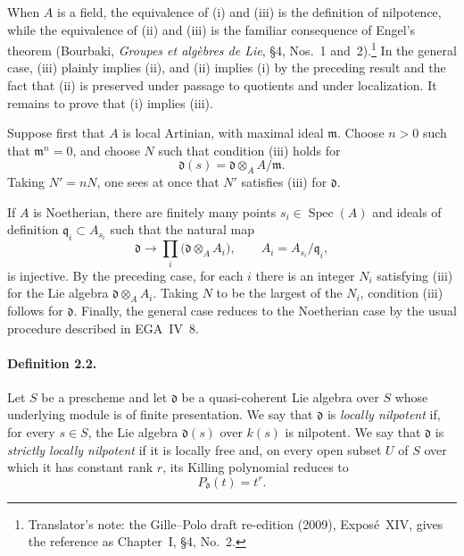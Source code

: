 
When \(A\) is a field, the equivalence of \textup{(i)} and
\textup{(iii)} is the definition of nilpotence, while the equivalence
of \textup{(ii)} and \textup{(iii)} is the familiar consequence of
Engel's theorem \textup{(Bourbaki, \emph{Groupes et algèbres de Lie},
\S4, Nos.~1 and~2)}.\footnote{Translator's note: the Gille--Polo draft re-edition (2009), Exposé~XIV, gives the reference as Chapter~I, \S4, No.~2.} In the general case,
\textup{(iii)} plainly implies \textup{(ii)}, and \textup{(ii)}
implies \textup{(i)} by the preceding result and the fact that
\textup{(ii)} is preserved under passage to quotients and under
localization. It remains to prove that \textup{(i)} implies
\textup{(iii)}.

Suppose first that \(A\) is local Artinian, with maximal ideal
\(\mathfrak m\). Choose \(n>0\) such that \(\mathfrak m^n=0\), and
choose \(N\) such that condition \textup{(iii)} holds for
\[
  \mathfrak d(s)=\mathfrak d\otimes_A A/\mathfrak m.
\]
Taking \(N'=nN\), one sees at once that \(N'\) satisfies
\textup{(iii)} for \(\mathfrak d\).

If \(A\) is Noetherian, there are finitely many points
\(s_i\in\operatorname{Spec}(A)\) and ideals of definition
\(\mathfrak q_i\subset A_{s_i}\) such that the natural map
\[
  \mathfrak d\longrightarrow
  \prod_i\bigl(\mathfrak d\otimes_A A_i\bigr),
  \qquad A_i=A_{s_i}/\mathfrak q_i,
\]
is injective. By the preceding case, for each \(i\) there is an
integer \(N_i\) satisfying \textup{(iii)} for the Lie algebra
\(\mathfrak d\otimes_A A_i\). Taking \(N\) to be the largest of the
\(N_i\), condition \textup{(iii)} follows for \(\mathfrak d\).
Finally, the general case reduces to the Noetherian case by the
usual procedure described in EGA~IV~8.

\paragraph{\textbf{Definition 2.2.}}
Let \(S\) be a prescheme and let \(\mathfrak d\) be a
quasi-coherent Lie algebra over \(S\) whose underlying module is of
finite presentation. We say that \(\mathfrak d\) is
\emph{locally nilpotent} if, for every \(s\in S\), the Lie algebra
\(\mathfrak d(s)\) over \(k(s)\) is nilpotent. We say that
\(\mathfrak d\) is \emph{strictly locally nilpotent} if it is
locally free and, on every open subset \(U\) of \(S\) over which it
has constant rank \(r\), its Killing polynomial reduces to
\[
  P_{\mathfrak d}(t)=t^r.
\]

